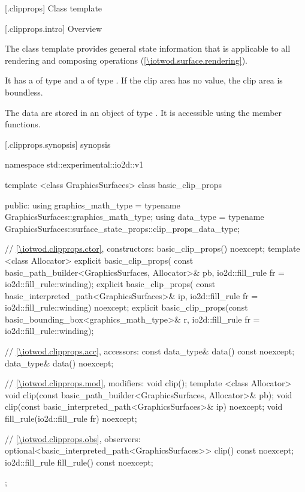 
 [\iotwod.clipprops] {Class template }

 [\iotwod.clipprops.intro] {Overview}

\pnum
The  class template provides general state information that is applicable to all rendering and composing operations (\ref{\iotwod.surface.rendering}).

\pnum
It has a  of type  and a  of type . If the clip area has no value, the clip area is boundless.

\pnum
The data are stored in an object of type . It is accessible using the  member functions.

 [\iotwod.clipprops.synopsis] { synopsis}

\begin{codeblock}
namespace std::experimental::io2d::v1 {
  template <class GraphicsSurfaces>
  class basic_clip_props {
  public:
    using graphics_math_type = typename GraphicsSurfaces::graphics_math_type;
    using data_type =
      typename GraphicsSurfaces::surface_state_props::clip_props_data_type;

    // \ref{\iotwod.clipprops.ctor}, constructors:
    basic_clip_props() noexcept;
    template <class Allocator>
    explicit basic_clip_props(
      const basic_path_builder<GraphicsSurfaces, Allocator>& pb,
      io2d::fill_rule fr = io2d::fill_rule::winding);
    explicit basic_clip_props(
      const basic_interpreted_path<GraphicsSurfaces>& ip,
      io2d::fill_rule fr = io2d::fill_rule::winding) noexcept;
    explicit basic_clip_props(const basic_bounding_box<graphics_math_type>& r,
      io2d::fill_rule fr = io2d::fill_rule::winding);

    // \ref{\iotwod.clipprops.acc}, accessors:
    const data_type& data() const noexcept;
    data_type& data() noexcept;

    // \ref{\iotwod.clipprops.mod}, modifiers:
    void clip();
    template <class Allocator>
    void clip(const basic_path_builder<GraphicsSurfaces, Allocator>& pb);
    void clip(const basic_interpreted_path<GraphicsSurfaces>& ip) noexcept;
    void fill_rule(io2d::fill_rule fr) noexcept;

    // \ref{\iotwod.clipprops.obs}, observers:
    optional<basic_interpreted_path<GraphicsSurfaces>> clip() const noexcept;
    io2d::fill_rule fill_rule() const noexcept;
  };
}
\end{codeblock}

